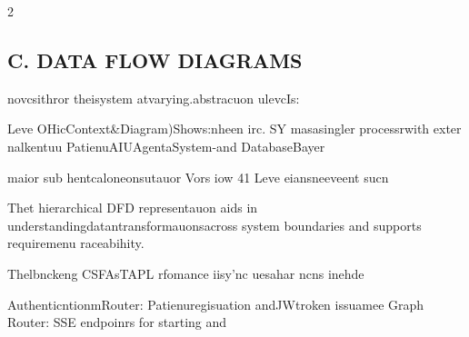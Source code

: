 \documentclass{article}
\begin{document}
\begin{paracol}{2}
\subsection*{C. DATA FLOW DIAGRAMS}


novcsithror theisystem atvarying.abstracuon
ulevcIs:


Leve OHicContext\&Diagram)Shows:nheen
irc. SY masasingler processrwith exter
nalkentuu PatienuAIUAgentaSystem-and
DatabaseBayer


maior sub
hentcaloneonsutauor Vors
iow 41
Leve eiansneeveent
sucn


Thet hierarchical DFD representauon aids in understandingdatantransformauonsacross system
boundaries and supports requiremenu raceabihity.


Thelbnckeng CSFAsTAPL rfomance
iisy'nc uesahar ncns
inehde


AuthenticntionmRouter: Patienuregisuation
andJWtroken issuamee
Graph Router: SSE endpoinrs for starting and

\end{paracol}
\end{document}
